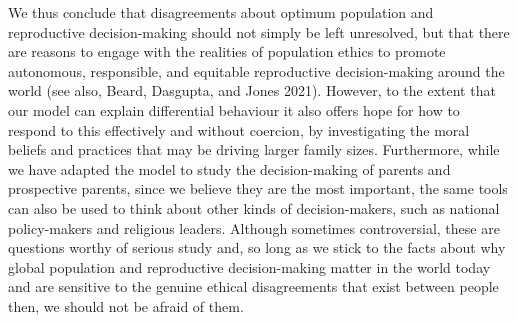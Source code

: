 \documentclass[man,11pt,a4paper,floatsintext]{apa7}
\begin{document}
We thus conclude that disagreements about optimum population and reproductive decision-making should not simply be left unresolved, but that there are reasons to engage with the realities of population ethics to promote autonomous, responsible, and equitable reproductive decision-making around the world (see also, Beard, Dasgupta, and Jones 2021). However, to the extent that our model can explain differential behaviour it also offers hope for how to respond to this effectively and without coercion, by investigating the moral beliefs and practices that may be driving larger family sizes. Furthermore, while we have adapted the model to study the decision-making of parents and prospective parents, since we believe they are the most important, the same tools can also be used to think about other kinds of decision-makers, such as national policy-makers and religious leaders. Although sometimes controversial, these are questions worthy of serious study and, so long as we stick to the facts about why global population and reproductive decision-making matter in the world today and are sensitive to the genuine ethical disagreements that exist between people then, we should not be afraid of them.
\end{document}
